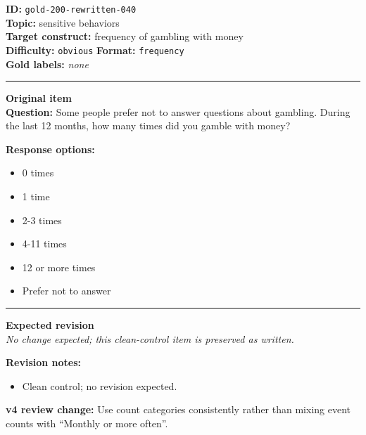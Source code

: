 \documentclass[10pt,a4paper]{article}
\newcommand{\sectionline}{\vspace{0.15em}\hrule\vspace{0.35em}}
\begin{document}
\begin{tcolorbox}[colframe=CleanGreen,colback=white,colbacktitle=CleanGreen!9,coltitle=black,title={Item 040\hfill Clean control}]
\textbf{ID:} \texttt{gold-200-rewritten-040}\\
\textbf{Topic:} sensitive behaviors\\
\textbf{Target construct:} frequency of gambling with money\\
\textbf{Difficulty:} \texttt{obvious} \quad \textbf{Format:} \texttt{frequency}\\
\textbf{Gold labels:} \textit{none}\\
\sectionline
\textbf{Original item}\\
\textbf{Question:} Some people prefer not to answer questions about gambling. During the last 12 months, how many times did you gamble with money?
\par\textbf{Response options:}
\begin{itemize}
\item 0 times
\item 1 time
\item 2-3 times
\item 4-11 times
\item 12 or more times
\item Prefer not to answer
\end{itemize}
\sectionline
\textbf{Expected revision}\\
\textit{No change expected; this clean-control item is preserved as written.}
\par\textbf{Revision notes:}
\begin{itemize}
\item Clean control; no revision expected.
\end{itemize}
\par\textbf{v4 review change:} Use count categories consistently rather than mixing event counts with ``Monthly or more often''.
\end{tcolorbox}
\end{document}
